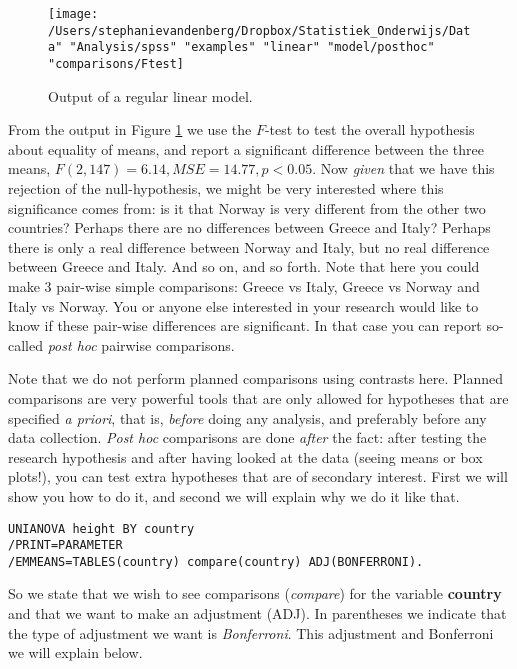 \begin{figure}[h]
    \begin{center}
       \texttt{[image: /Users/stephanievandenberg/Dropbox/Statistiek\_Onderwijs/Data" "Analysis/spss" "examples" "linear" "model/posthoc" "comparisons/Ftest]}
    \end{center}
    \caption{Output of a regular linear model.}
    \label{fig:Ftest}
\end{figure}


From the output in Figure \ref{fig:Ftest} we use the $F$-test to test the overall hypothesis about equality of means, and report a significant difference between the three means, $F(2, 147)=6.14 , MSE=14.77, p<0.05$. Now \textit{given} that we have this rejection of the null-hypothesis, we might be very interested where this significance comes from: is it that Norway is very different from the other two countries? Perhaps there are no differences between Greece and Italy? Perhaps there is only a real difference between Norway
and Italy, but no real difference between Greece and Italy. And so on, and so forth. Note that here you could make 3 pair-wise simple comparisons: Greece vs Italy, Greece vs Norway and Italy vs Norway. You or anyone else interested in your research would like to know if these pair-wise differences are significant. In that case you can report so-called \textit{post hoc} pairwise comparisons. 

Note that we do not perform planned comparisons using contrasts here. Planned comparisons are very powerful tools that are only allowed for hypotheses that are specified \textit{a priori}, that is, \textit{before} doing any analysis, and preferably before any data collection. \textit{Post hoc} comparisons are done \textit{after} the fact: after testing the research hypothesis and after having looked at the data (seeing means or box plots!), you can test extra hypotheses that are of secondary interest. First we will show you how to do it, and second we will explain why we do it like that. 

\begin{verbatim}
UNIANOVA height BY country
/PRINT=PARAMETER
/EMMEANS=TABLES(country) compare(country) ADJ(BONFERRONI).
\end{verbatim}

So we state that we wish to see comparisons (\textit{compare}) for the variable \textbf{country} and that we want to make an adjustment (ADJ). In parentheses we indicate that the type of adjustment we want is \textit{Bonferroni}. This adjustment and Bonferroni we will explain below.


